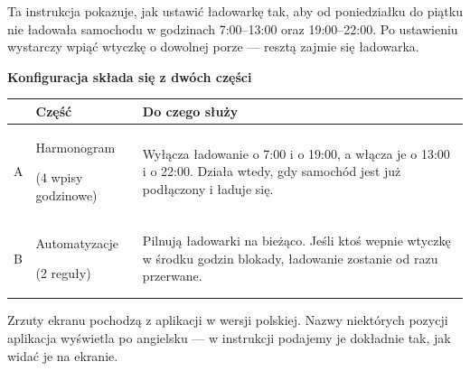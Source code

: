 \documentclass[11pt]{article}
\begin{document}

\vspace{0.1cm}
{\large\color{apink} Ta instrukcja pokazuje, jak ustawić ładowarkę tak, aby od poniedziałku do piątku nie ładowała samochodu w godzinach 7:00--13:00 oraz 19:00--22:00. Po ustawieniu wystarczy wpiąć wtyczkę o dowolnej porze — resztą zajmie się ładowarka.}


\vspace{0.2cm}
{\bfseries\color{apnavy}\large Konfiguracja składa się z dwóch części}

\vspace{0.15cm}
\begin{tabularx}{\textwidth}{@{}p{0.5cm}p{4.6cm}X@{}}
\toprule
& \textbf{\color{apnavy}Część} & \textbf{\color{apnavy}Do czego służy}\\
\midrule
A & Harmonogram \par {\footnotesize (4 wpisy godzinowe)} & Wyłącza ładowanie o 7:00 i o 19:00, a włącza je o 13:00 i o 22:00. Działa wtedy, gdy samochód jest już podłączony i ładuje się.\\
B & Automatyzacje \par {\footnotesize (2 reguły)} & Pilnują ładowarki na bieżąco. Jeśli ktoś wepnie wtyczkę w środku godzin blokady, ładowanie zostanie od razu przerwane.\\
\bottomrule
\end{tabularx}


\vspace{0.4cm}
{\footnotesize\color{apmuted} Zrzuty ekranu pochodzą z aplikacji w wersji polskiej. Nazwy niektórych pozycji aplikacja wyświetla po angielsku — w instrukcji podajemy je dokładnie tak, jak widać je na ekranie.}
\end{document}
